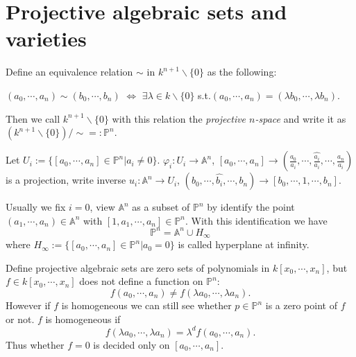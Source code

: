 \section{Projective algebraic sets and varieties}
\begin{definition}
	Define an equivalence relation $ \sim $ in $ k^{n+1}\backslash \{0\} $ as the following:
	\begin{center}
		$ (a_0,\cdots,a_n)\sim(b_0,\cdots,b_n) $ $ \Leftrightarrow $ $ \exists \lambda\in k\backslash \{0\} $ s.t.$ (a_0,\cdots,a_n) = (\lambda b_0,\cdots,\lambda b_n)$.
	\end{center}
	Then we call $  k^{n+1}\backslash \{0\} $ with this relation the \textit{projective $ n $-space} and write it as $ (k^{n+1}\backslash\{0\})/\sim =: \mathbb{P}^n $.
\end{definition}
\begin{definition}
	Let $ U_i:=\{[a_0,\cdots,a_n]\in \mathbb{P}^n|a_i\neq 0 \} $. $ \varphi_i: U_i\to \mathbb{A}^n $, $ [a_0,\cdots,a_n]\to (\frac{a_0}{a_i},\cdots,\hat{\frac{a_i}{a_i}},\cdots,\frac{a_n}{a_i}) $ is a projection, write inverse $ u_i:\mathbb{A}^n\to U_i $, $ (b_0,\cdots,\hat{b_i},\cdots,b_n)\to [b_0,\cdots,1,\cdots,b_n] $.

	Usually we fix $ i=0 $, view $ \mathbb{A}^n $ as a subset of $ \mathbb{P}^n $ by identify the point $ (a_1,\cdots,a_n)\in\mathbb{A}^n $ with $ [1,a_1,\cdots,a_n]\in \mathbb{P}^n $. With this identification we have
	\begin{equation}
		\mathbb{P}^n=\mathbb{A}^n\cup H_{\infty}
	\end{equation}
	where $ H_{\infty} :=\{ [a_0,\cdots,a_n]\in \mathbb{P}^n|a_0=0 \} $ is called hyperplane at infinity.
\end{definition}
\begin{remark}
	Define projective algebraic sets are zero sets of polynomials in $ k[x_0,\cdots,x_n] $, but $ f\in k[x_0,\cdots,x_n] $ does not define a function on $ \mathbb{P}^n $:
	\begin{equation}
		f(a_0,\cdots,a_n)\neq f(\lambda a_0,\cdots,\lambda a_n).
	\end{equation}
	However if $ f $ is homogeneous we can still see whether $ p\in \mathbb{P}^n $ is a zero point of $ f $ or not. $ f $ is homogeneous if
	\begin{equation}
		f(\lambda a_0,\cdots,\lambda a_n)=\lambda^d f(a_0,\cdots,a_n).
	\end{equation}
	Thus whether $ f=0 $ is decided only on $ [a_0,\cdots,a_n] $.
\end{remark}
